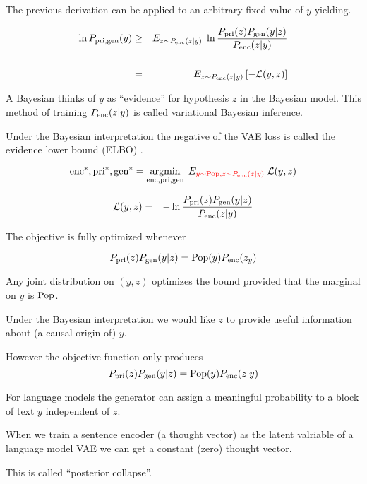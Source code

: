 {

The previous derivation can be applied to an arbitrary fixed value of $y$ yielding.

\begin{eqnarray*}
\ln P_{\mathrm{pri},\mathrm{gen}}(y) & \geq  & E_{z \sim P_{\mathrm{enc}}(z|y)}\; \ln \frac{P_{\mathrm{pri}}(z)P_{\mathrm{gen}}(y|z)}{P_{\mathrm{enc}}(z|y)} \\
\\
& = & E_{z \sim P_{\mathrm{enc}}(z|y)}\left[-{\cal L}(y,z)\right]
\end{eqnarray*}

\vfill
A Bayesian thinks of $y$ as ``evidence'' for hypothesis $z$ in the Bayesian model.  This method of training $P_{\mathrm{enc}}(z|y)$ is called {\color{red} variational Bayesian inference}.

\vfill
Under the Bayesian interpretation the negative of the VAE loss is called {\color{red} the evidence lower bound (ELBO)}    .


$$\mathrm{enc}^*,\mathrm{pri}^*,\mathrm{gen}^* = \operatorname*{argmin}_{\mathrm{enc},\mathrm{pri},\mathrm{gen}}\;E_{\color{red} y \sim \mathrm{Pop},z\sim P_{\mathrm{enc}}(z|y)}\;{\cal L}(y,z)$$

\vfill
\begin{eqnarray*}
{\cal L}(y,z) & = & - \ln \frac{P_{\mathrm{pri}}(z)P_{\mathrm{gen}}(y|z)}{P_{\mathrm{enc}}(z|y)}
\end{eqnarray*}

\vfill
The objective is fully optimized whenever

\vfill
{\color{red} $$P_{\mathrm{pri}}(z)P_{\mathrm{gen}}(y|z) = \mathrm{Pop}(y)P_{\mathrm{enc}}(z_y)$$}

\vfill
Any joint distribution on $(y,z)$ optimizes the bound provided that the marginal on $y$ is $\mathrm{Pop}$.


Under the Bayesian interpretation we would like $z$ to provide useful information about (a causal origin of) $y$.

\vfill
However the objective function only produces
$$P_{\mathrm{pri}}(z)P_{\mathrm{gen}}(y|z) = \mathrm{Pop}(y)P_{\mathrm{enc}}(z|y)$$

\vfill
For language models the generator can assign a meaningful probability to a block of text $y$ independent of $z$.

\vfill
When we train a sentence encoder (a thought vector) as the latent valriable of a language model VAE we can get a constant (zero) thought vector.

\vfill
This is called ``posterior collapse''.

}
